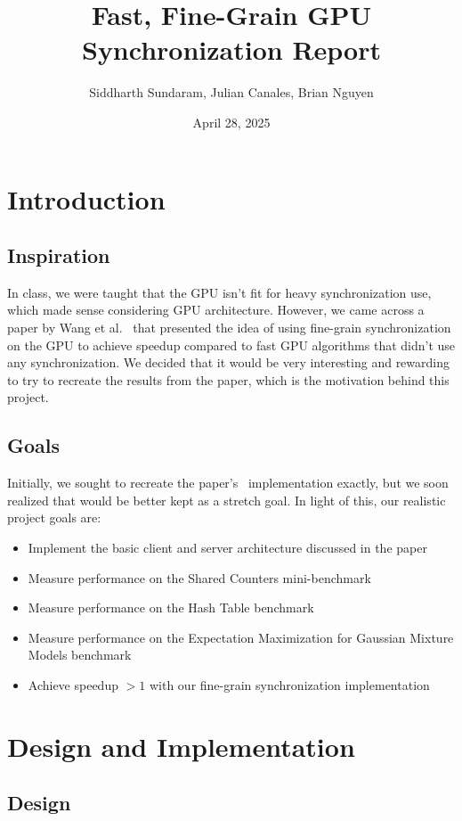\documentclass{article}
\title{Fast, Fine-Grain GPU Synchronization Report}
\author{Siddharth Sundaram, Julian Canales, Brian Nguyen}
\date{April 28, 2025}
\begin{document}
\maketitle

\section{Introduction}
\subsection{Inspiration}

In class, we were taught that the GPU isn't fit for heavy synchronization use, which made sense considering GPU architecture. However, we came across a paper by Wang et al.~\cite{wang2019fast} that presented the idea of using fine-grain synchronization on the GPU to achieve speedup compared to fast GPU algorithms that didn't use any synchronization. We decided that it would be very interesting and rewarding to try to recreate the results from the paper, which is the motivation behind this project.

\subsection{Goals}

Initially, we sought to recreate the paper's~\cite{wang2019fast} implementation exactly, but we soon realized that would be better kept as a stretch goal. In light of this, our realistic project goals are:
\begin{itemize}
    \item Implement the basic client and server architecture discussed in the paper
    \item Measure performance on the Shared Counters mini-benchmark
    \item Measure performance on the Hash Table benchmark
    \item Measure performance on the Expectation Maximization for Gaussian Mixture Models benchmark
    \item Achieve speedup $> 1$ with our fine-grain synchronization implementation
\end{itemize}

\section{Design and Implementation}
\subsection{Design}
\end{document}

